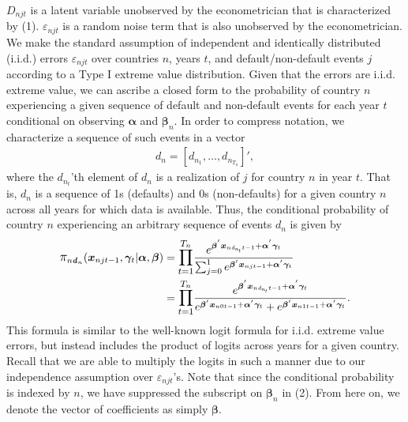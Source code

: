 \documentclass[12pt]{article}
\begin{document}
$D_{njt}$ is a latent variable unobserved by the econometrician that is characterized by (1). $\varepsilon_{njt}$ is a random noise term that is also unobserved by the econometrician. We make the standard assumption of independent and identically distributed (i.i.d.) errors $\varepsilon_{njt}$ over countries $n$, years $t$, and default/non-default events $j$ according to a Type I extreme value distribution. Given that the errors are i.i.d. extreme value, we can ascribe a closed form to the probability of country $n$ experiencing a given sequence of default and non-default events for each year $t$ conditional on observing $\boldsymbol{\alpha}$ and $\boldsymbol{\beta}_n$. In order to compress notation, we characterize a sequence of such events in a vector
\begin{gather*}
\boldsymbol{\mathit{d}}_n = [\mathit{d}_{n_{1}}, \dots, \mathit{d}_{n_{T_n}}]',
\end{gather*}
where the $\mathit{d_{n_t}}$'th element of $\boldsymbol{\mathit{d}}_n$ is a realization of $j$ for country $n$ in year $t$. That is, $\boldsymbol{\mathit{d}}_n$ is a sequence of 1s (defaults) and 0s (non-defaults) for a given country $n$ across all years for which data is available. Thus, the conditional probability of country $n$ experiencing an arbitrary sequence of events $\boldsymbol{\mathit{d}}_n$ is given by
\begin{align}
\mathlarger{\pi}_{n\boldsymbol{\mathit{d}}_n}(\boldsymbol{x}_{njt-1}, \boldsymbol{\gamma}_t | \boldsymbol{\alpha},\boldsymbol{\beta}) &= 
\mathlarger{\prod_{t=1}^{T_n}} \frac{e^{\boldsymbol{\beta}^{'} \boldsymbol{x}_{n  \mathit{d_{n_t}} t-1} + \boldsymbol{\alpha}^{'}\boldsymbol{\gamma}_t}}{\sum_{j=0}^1 e^{\boldsymbol{\beta}^{'} \boldsymbol{x}_{njt-1} + \boldsymbol{\alpha}^{'}\boldsymbol{\gamma}_t}} \nonumber \\
&= \mathlarger{\prod_{t=1}^{T_n}} \frac{e^{\boldsymbol{\beta}^{'} \boldsymbol{x}_{n  \mathit{d_{n_t}} t-1} + \boldsymbol{\alpha}^{'}\boldsymbol{\gamma}_t}}{e^{\boldsymbol{\beta}^{'} \boldsymbol{x}_{n0t-1} + \boldsymbol{\alpha}^{'}\boldsymbol{\gamma}_t} + e^{\boldsymbol{\beta}^{'} \boldsymbol{x}_{n1t-1} + \boldsymbol{\alpha}^{'}\boldsymbol{\gamma}_t}}.
\end{align}
This formula is similar to the well-known logit formula for i.i.d. extreme value errors, but instead includes the product of logits across years for a given country. Recall that we are able to multiply the logits in such a manner due to our independence assumption over $\varepsilon_{njt}$'s. Note that since the conditional probability is indexed by $n$, we have suppressed the subscript on $\boldsymbol{\beta}_n$ in (2). From here on, we denote the vector of coefficients as simply $\boldsymbol{\beta}$.
\end{document}
